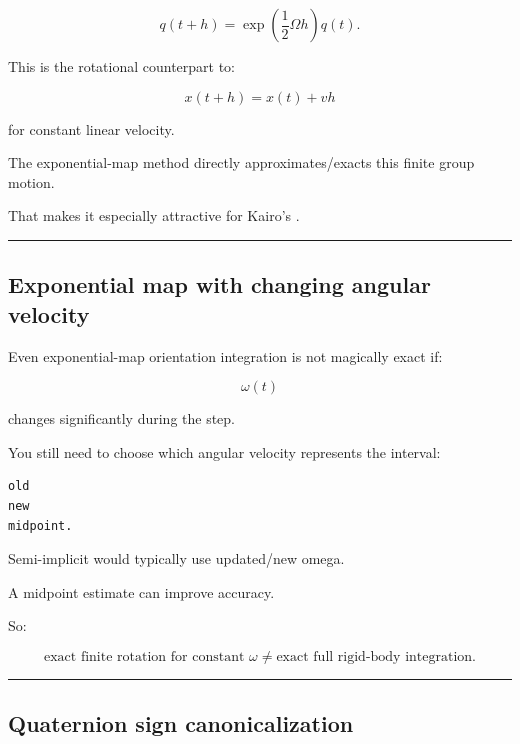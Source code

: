 \[
q(t+h)
=
\exp\left(
\frac12\Omega h
\right)
q(t).
\]

This is the rotational counterpart to:

\[
x(t+h)
=
x(t)+vh
\]

for constant linear velocity.

The exponential-map method directly approximates/exacts this finite group motion.

That makes it especially attractive for Kairo's .

\begin{center}\rule{0.5\linewidth}{0.5pt}\end{center}

\subsection{Exponential map with changing angular velocity}\label{06-engine-ii-ch038-exponential-map-with-changing-angular-velocity}

\hypertarget{06-engine-ii-ch038-exponential-map-with-changing-angular-velocity}{}

Even exponential-map orientation integration is not magically exact if:

\[
\omega(t)
\]

changes significantly during the step.

You still need to choose which angular velocity represents the interval:

\begin{verbatim}
old
new
midpoint.
\end{verbatim}

Semi-implicit would typically use updated/new omega.

A midpoint estimate can improve accuracy.

So:

\[
\boxed{
\text{exact finite rotation for constant }\omega
\neq
\text{exact full rigid-body integration}.
}
\]

\begin{center}\rule{0.5\linewidth}{0.5pt}\end{center}

\subsection{Quaternion sign canonicalization}\label{06-engine-ii-ch038-quaternion-sign-canonicalization}

